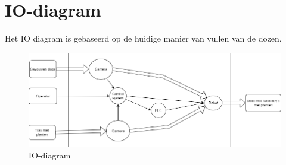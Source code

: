 
\section{IO-diagram}
Het IO diagram is gebaseerd op de huidige manier van vullen van de dozen.  
\newline
\newline
\begin{figure}[h]
	\centering
	\includegraphics[width=\textwidth]{Afbeeldingen/IO-diagram_v2.png}
	\caption{IO-diagram}
\end{figure}


